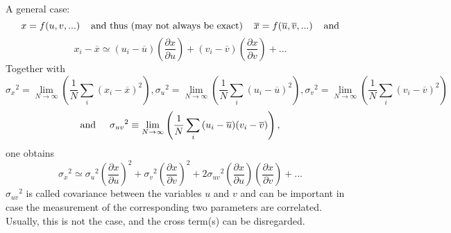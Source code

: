 \documentclass[12pt]{article}
\begin{document}
A general case:\\
\begin{displaymath}
x=f(u,v,...)
\hspace*{4mm}\mbox{and thus (may not always be exact)}\hspace*{4mm}
\overline{x}=f(\overline{u},\overline{v},...)\hspace*{4mm}\mbox{and}
\end{displaymath}
\begin{displaymath}
x_i-\overline{x}\simeq
(u_i-\overline{u})\left(\frac{\partial x}{\partial u}\right)+
(v_i-\overline{v})\left(\frac{\partial x}{\partial v}\right)+...
\end{displaymath}
Together with
\begin{displaymath}
{\sigma_x}^2= \lim_{N \rightarrow
  \infty}\left(\frac{1}{N}\sum_i{(x_i-\overline{x})^2}\right),
{\sigma_u}^2= \lim_{N \rightarrow
  \infty}\left(\frac{1}{N}\sum_i{(u_i-\overline{u})^2}\right),
{\sigma_v}^2= \lim_{N \rightarrow
  \infty}\left(\frac{1}{N}\sum_i{(v_i-\overline{v})^2}\right)
\end{displaymath}
\begin{displaymath}
\mbox{and}\hspace*{5mm} {\sigma_{uv}}^2\equiv \lim_{N \rightarrow
  \infty}\left(\frac{1}{N}\sum_i{(u_i-\overline{u})(v_i-\overline{v})}\right),
\end{displaymath}
one obtains
\begin{displaymath}
{\sigma_x}^2\simeq
{\sigma_u}^2\left(\frac{\partial x}{\partial u}\right)^2+
{\sigma_v}^2\left(\frac{\partial x}{\partial v}\right)^2+
2{\sigma_{uv}}^2\left(\frac{\partial x}{\partial u}\right)
\left(\frac{\partial x}{\partial v}\right)+...
\end{displaymath}
${\sigma_{uv}}^2$ is called covariance between the variables $u$ and $v$
and can be important in case the measurement of the corresponding two
parameters are correlated. Usually, this is not the case, and the cross
term(s) can be disregarded.
\end{document}
